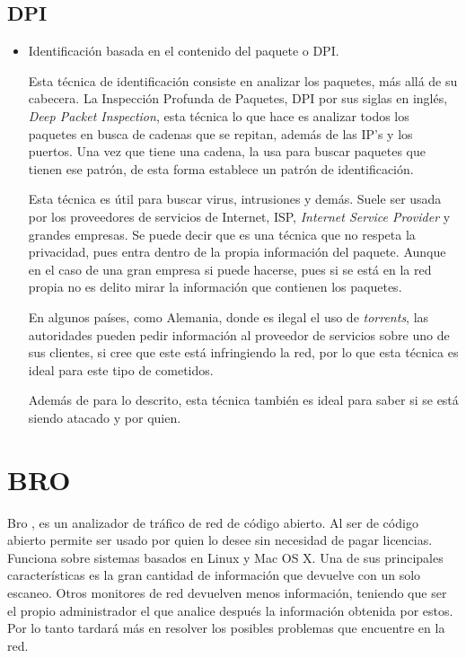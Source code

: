 \subsection{DPI}

\begin{itemize}

\item Identificación basada en el contenido del paquete o DPI. \cite{payload}

\intro Esta técnica de identificación consiste en analizar los paquetes, más allá de su cabecera. 
La Inspección Profunda de Paquetes, DPI por sus siglas en inglés, \textit{Deep Packet Inspection}, esta técnica 
lo que hace es analizar todos los paquetes en busca de cadenas que se repitan, además 
de las IP's y los puertos. Una vez que tiene una cadena, la usa para buscar paquetes que tienen ese patrón, 
de esta forma establece un patrón de identificación.

\intro Esta técnica es útil para buscar virus, intrusiones y demás. Suele ser usada por los proveedores de 
servicios de Internet, ISP, \textit{Internet Service Provider} y grandes empresas. 
Se puede decir que es una técnica que no respeta la privacidad, pues entra dentro de la propia información del paquete. Aunque en el caso de una gran empresa si puede hacerse, pues si se está en la red propia 
no es delito mirar la información que contienen los paquetes. 

\intro En algunos países, como Alemania, donde es ilegal el uso de \textit{torrents}, 
las autoridades pueden pedir información al proveedor de servicios sobre uno de sus clientes, si cree que este 
está infringiendo la red, por lo que esta técnica es ideal para este tipo de cometidos.

\intro Además de para lo descrito, esta técnica también es ideal para saber si se está siendo atacado y por quien. 
\cite{dpiaproximacion}
\end{itemize}

\section{BRO}

Bro \cite{broindex}, es un analizador de tráfico de red de código abierto. Al ser de código abierto permite 
ser usado por quien lo desee sin necesidad de pagar licencias. Funciona sobre sistemas basados en Linux y 
Mac OS X. Una de sus principales características es la gran cantidad de información que devuelve con un solo 
escaneo. Otros monitores de red devuelven menos información, teniendo que ser el propio administrador el que 
analice después la información obtenida por estos. Por lo tanto tardará más en resolver los posibles problemas 
que encuentre en la red.

